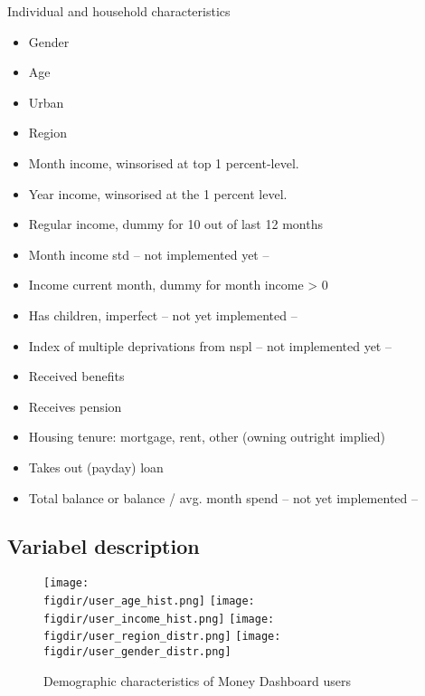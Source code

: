 Individual and household characteristics
\begin{itemize}
    \item Gender

    \item Age

    \item Urban

    \item Region

    \item Month income, winsorised at top 1 percent-level.

    \item Year income, winsorised at the 1 percent level.

    \item Regular income, dummy for 10 out of last 12 months

    \item Month income std -- not implemented yet --

    \item Income current month, dummy for month income > 0

    \item Has children, imperfect -- not yet implemented --

    \item Index of multiple deprivations from nspl -- not implemented yet --

    \item Received benefits

    \item Receives pension

    \item Housing tenure: mortgage, rent, other (owning outright implied)

    \item Takes out (payday) loan

    \item Total balance or balance / avg. month spend -- not yet implemented --
\end{itemize}


\subsection{Variabel description}%
\label{sub:variabel_description}

\begin{figure}[H]
    \caption{Demographic characteristics of Money Dashboard users}
    \label{fig:demographics}
    \begin{center}
        \texttt{[image: \\figdir/user\_age\_hist.png]}
        \texttt{[image: \\figdir/user\_income\_hist.png]}
        \texttt{[image: \\figdir/user\_region\_distr.png]}
        \texttt{[image: \\figdir/user\_gender\_distr.png]}
    \end{center}
\end{figure}


